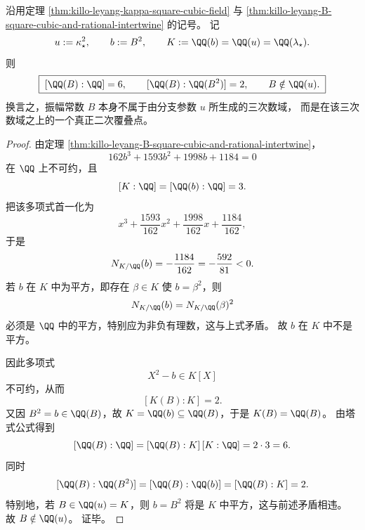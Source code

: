 \begin{theorem}\label{thm:xi-leyang-amplitude-B-true-quadratic-cover}
沿用定理 \ref{thm:killo-leyang-kappa-square-cubic-field} 与
\ref{thm:killo-leyang-B-square-cubic-and-rational-intertwine} 的记号。
记
\[
u:=\kappa_\star^2,
\qquad
b:=B^2,
\qquad
K:=\QQ(b)=\QQ(u)=\QQ(\lambda_\star).
\]
则
\[
\boxed{\;
[\QQ(B):\QQ]=6,
\qquad
[\QQ(B):\QQ(B^2)]=2,
\qquad
B\notin \QQ(u).\;}
\]
换言之，振幅常数 \(B\) 本身不属于由分支参数 \(u\) 所生成的三次数域，
而是在该三次数域之上的一个真正二次覆叠点。
\end{theorem}
\begin{proof}
由定理 \ref{thm:killo-leyang-B-square-cubic-and-rational-intertwine}，
\[
162b^3+1593b^2+1998b+1184=0
\]
在 \(\QQ\) 上不可约，且
\[
[K:\QQ]=[\QQ(b):\QQ]=3.
\]
把该多项式首一化为
\[
x^3+\frac{1593}{162}x^2+\frac{1998}{162}x+\frac{1184}{162},
\]
于是
\[
N_{K/\QQ}(b)
=
-\frac{1184}{162}
=
-\frac{592}{81}<0.
\]
若 \(b\) 在 \(K\) 中为平方，即存在 \(\beta\in K\) 使
\(
b=\beta^2
\)，则
\[
N_{K/\QQ}(b)=N_{K/\QQ}(\beta)^2
\]
必须是 \(\QQ\) 中的平方，特别应为非负有理数，这与上式矛盾。
故 \(b\) 在 \(K\) 中不是平方。
\par
因此多项式
\[
X^2-b\in K[X]
\]
不可约，从而
\[
[K(B):K]=2.
\]
又因 \(B^2=b\in \QQ(B)\)，故
\(
K=\QQ(b)\subseteq \QQ(B)
\)，于是 \(K(B)=\QQ(B)\)。
由塔式公式得到
\[
[\QQ(B):\QQ]=[\QQ(B):K]\,[K:\QQ]=2\cdot 3=6.
\]
同时
\[
[\QQ(B):\QQ(B^2)]=[\QQ(B):\QQ(b)]=[\QQ(B):K]=2.
\]
特别地，若 \(B\in \QQ(u)=K\)，则 \(b=B^2\) 将是 \(K\) 中平方，这与前述矛盾相违。
故 \(B\notin \QQ(u)\)。
证毕。
\end{proof}

